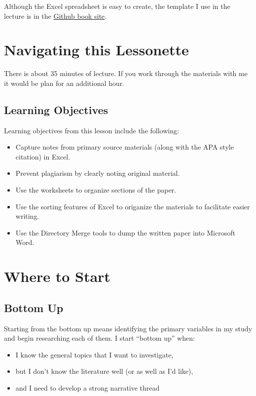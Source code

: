 \documentclass[
  english,
]{book}
\providecommand{\tightlist}{%
  \setlength{\itemsep}{0pt}\setlength{\parskip}{0pt}}
\begin{document}
Although the Excel spreadsheet is easy to create, the template I use in the lecture is in the \href{https://github.com/lhbikos/ReC_Topics}{Github book site}.

\hypertarget{navigating-this-lessonette-2}{%
\section{Navigating this Lessonette}\label{navigating-this-lessonette-2}}

There is about 35 minutes of lecture. If you work through the materials with me it would be plan for an additional hour.

\hypertarget{learning-objectives-11}{%
\subsection{Learning Objectives}\label{learning-objectives-11}}

Learning objectives from this lesson include the following:

\begin{itemize}
\tightlist
\item
  Capture notes from primary source materials (along with the APA style citation) in Excel.
\item
  Prevent plagiarism by clearly noting original material.
\item
  Use the worksheets to organize sections of the paper.
\item
  Use the sorting features of Excel to origanize the materials to facilitate easier writing.
\item
  Use the Directory Merge tools to dump the written paper into Microsoft Word.
\end{itemize}

\hypertarget{where-to-start}{%
\section{Where to Start}\label{where-to-start}}

\hypertarget{bottom-up}{%
\subsection{Bottom Up}\label{bottom-up}}

Starting from the bottom up means identifying the primary variables in my study and begin researching each of them. I start ``bottom up'' when:

\begin{itemize}
\tightlist
\item
  I know the general topics that I want to investigate,
\item
  but I don't know the literature well (or as well as I'd like),
\item
  and I need to develop a strong narrative thread
\end{itemize}
\end{document}
